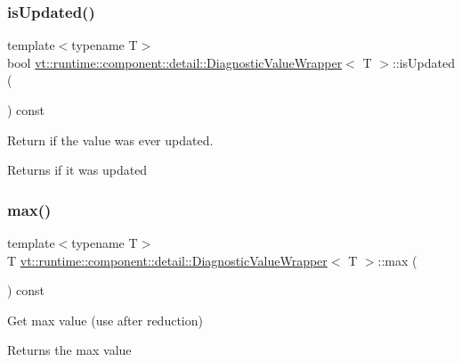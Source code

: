 \subsubsection{\texorpdfstring{is\+Updated()}{isUpdated()}}
{\footnotesize\ttfamily template$<$typename T$>$ \\
bool \hyperlink{structvt_1_1runtime_1_1component_1_1detail_1_1_diagnostic_value_wrapper}{vt\+::runtime\+::component\+::detail\+::\+Diagnostic\+Value\+Wrapper}$<$ T $>$\+::is\+Updated (\begin{DoxyParamCaption}{ }\end{DoxyParamCaption}) const\hspace{0.3cm}{\ttfamily [inline]}}



Return if the value was ever updated. 

\begin{DoxyReturn}{Returns}
if it was updated 
\end{DoxyReturn}
\mbox{\label{structvt_1_1runtime_1_1component_1_1detail_1_1_diagnostic_value_wrapper_a366f9b83f55552c1b02f03c0fb65e72a}} 
\subsubsection{\texorpdfstring{max()}{max()}}
{\footnotesize\ttfamily template$<$typename T$>$ \\
T \hyperlink{structvt_1_1runtime_1_1component_1_1detail_1_1_diagnostic_value_wrapper}{vt\+::runtime\+::component\+::detail\+::\+Diagnostic\+Value\+Wrapper}$<$ T $>$\+::max (\begin{DoxyParamCaption}{ }\end{DoxyParamCaption}) const\hspace{0.3cm}{\ttfamily [inline]}}



Get max value (use after reduction) 

\begin{DoxyReturn}{Returns}
the max value 
\end{DoxyReturn}
\mbox{\label{structvt_1_1runtime_1_1component_1_1detail_1_1_diagnostic_value_wrapper_acdb00b0b9110024df3e6673640702ebd}} 
